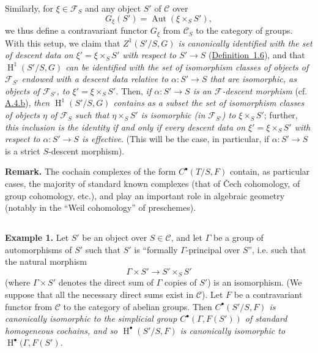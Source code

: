 \documentclass{article}
\newenvironment{rmenv}[1]
  {\phantomsection\par\medskip\noindent\textbf{#1.}\rmfamily}
  {\medskip}
\renewcommand{\cal}[1]{{\mathcal{#1}}}
\DeclareMathOperator{\Aut}{Aut}
\DeclareMathOperator{\HH}{H}
\newcommand{\oldpage}[1]{\marginpar{\footnotesize$\Big\vert$ \textit{p.~#1}}}
\begin{document}
Similarly, for $\xi\in\cal{F}_S$ and any object $S'$ of $\cal{C}$ over
\[
  G_\xi(S') = \Aut(\xi\times_S S'),
\]
we thus define a contravariant functor $G_\xi$ from $\cal{C}_S$ to the category of
\oldpage{190-14}
groups.
With this setup, we claim that \emph{$Z^1(S'/S,G)$ is canonically identified with the set of descent data on $\xi'=\xi\times_S S'$ with respect to $S'\to S$} (\hyperref[definition:A.1.6]{Definition~1.6}), and that \emph{$\HH^1(S'/S,G)$ can be identified with the set of isomorphism classes of objects of $\cal{F}_{S'}$ endowed with a descent data relative to $\alpha\colon S'\to S$ that are isomorphic, as objects of $\cal{F}_{S'}$, to $\xi'=\xi\times_S S'$.}
Then, \emph{if $\alpha\colon S'\to S$ is an $\cal{F}$-descent morphism} (cf. \hyperref[A.4.b]{A.4.b}), \emph{then $\HH^1(S'/S,G)$ contains as a subset the set of isomorphism classes of objects $\eta$ of $\cal{F}_S$ such that $\eta\times_S S'$ is isomorphic (in $\cal{F}_{S'}$) to $\xi\times_S S'$};
further, \emph{this inclusion is the identity if and only if every descent data on $\xi'=\xi\times_S S'$ with respect to $\alpha\colon S'\to S$ is effective}.
(This will be the case, in particular, if $\alpha\colon S'\to S$ is a strict $S$-descent morphism).

\begin{rmenv}{Remark}
  The cochain complexes of the form $C^\bullet(T/S,F)$ contain, as particular cases, the majority of standard known complexes (that of \v{C}ech cohomology, of group cohomology, etc.), and play an important role in algebraic geometry (notably in the ``Weil cohomology'' of preschemes).
\end{rmenv}


\subsection{}
\label{A.4.d}

\begin{rmenv}{Example 1}
\label{example:A.4.d}
  Let $S'$ be an object over $S\in\cal{C}$, and let $\Gamma$ be a group of automorphisms of $S'$ such that $S'$ is ``formally $\Gamma$-principal over $S$'', i.e. such that the natural morphism
  \[
    \Gamma\times S' \to S'\times_S S'
  \]
  (where $\Gamma\times S'$ denotes the direct sum of $\Gamma$ copies of $S'$) is an isomorphism.
  (We suppose that all the necessary direct sums exist in $\cal{C}$).
  Let $F$ be a contravariant functor from $\cal{C}$ to the category of abelian groups.
  Then \emph{$C^\bullet(S'/S,F)$ is canonically isomorphic to the simplicial group $C^\bullet(\Gamma,F(S'))$ of standard homogeneous cochains, and so $\HH^\bullet(S'/S,F)$ is canonically isomorphic to $\HH^\bullet(\Gamma,F(S')$}.
\end{rmenv}
\end{document}
